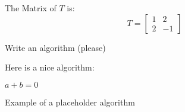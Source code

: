 \documentclass{my-cls}
\begin{document}
\begin{solution}[4]
    The Matrix of \(T\) is:
    \[ T=
    \begin{bmatrix}
    1 & 2 \\
    2 & -1 
    \end{bmatrix}
    \]
\end{solution}


\bigskip
\begin{problem}
    Write an algorithm (please)
\end{problem}

\begin{solution}
    Here is a nice algorithm:
    
    \begin{algorithm}
        \begin{algorithmic}[1]
                    \State \Return{}
                \EndIf
                \State $a + b = 0$
            \EndFunction
        \end{algorithmic}
        \caption{Example of a placeholder algorithm}
    \end{algorithm}
    
    \bigskip
\end{solution}


\end{document}
